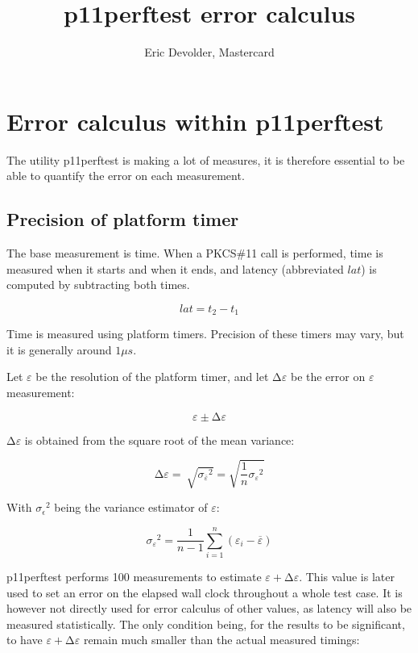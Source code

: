 \documentclass[12pt]{article}
\title{p11perftest error calculus}
\author{Eric Devolder, Mastercard}
\begin{document}
\hypertarget{error-calculus-within-p11perftest}{%
\section{Error calculus within p11perftest}\label{error-calculus-within-p11perftest}}

The utility p11perftest is making a lot of measures, it is therefore essential to be able to quantify the error on each measurement.

\hypertarget{precision-of-platform-timer}{%
\subsection{Precision of platform timer}\label{precision-of-platform-timer}}

The base measurement is time. When a PKCS\#11 call is performed, time is measured when it starts and when it ends, and latency (abbreviated \(lat\)) is computed by subtracting both times.

\[lat = t_{2} - t_{1}\]

Time is measured using platform timers. Precision of these timers may vary, but it is generally around \( 1 \mu s\).

Let \(\varepsilon\) be the resolution of the platform timer, and let \(\mathrm{\Delta}\varepsilon\) be the error on \(\varepsilon\) measurement:

\[\varepsilon \pm \mathrm{\Delta}\varepsilon\]

\(\mathrm{\Delta}\varepsilon\) is obtained from the square root of the mean variance:

\[\mathrm{\Delta}\varepsilon = \ \sqrt{{\sigma_{\overline{\varepsilon}}}^{2}} = \sqrt{\frac{1}{n}{\sigma_{\varepsilon}}^{2}}\]

With \({\sigma_{\epsilon}}^{2}\) being the variance estimator of
\(\varepsilon:\)

\[{\sigma_{\varepsilon}}^{2} = \frac{1}{n - 1}\sum_{i = 1}^{n}\left( \varepsilon_{i} - \overline{\varepsilon} \right)\]

p11perftest performs 100 measurements to estimate \(\varepsilon + \mathrm{\Delta}\varepsilon\). This value is later used to set an error on the elapsed wall clock throughout a whole test case. It is however not directly used for error calculus of other values, as latency will also be measured statistically. The only condition being, for the results to be significant, to have \(\varepsilon + \mathrm{\Delta}\varepsilon\) remain much smaller than the actual measured timings:
\end{document}
